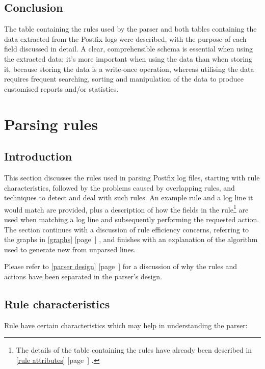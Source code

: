 \documentclass[a4paper,12pt,draft]{article}
\newcommand{\refwithpage}[1]{%
    \empty{}\ref{#1} [page~\pageref{#1}]%
}
\newcommand{\sectionref}[1]{%
    \textsection{}\refwithpage{#1}%
}
\begin{document}
\subsection{Conclusion}

The table containing the rules used by the parser and both tables
containing the data extracted from the Postfix logs were described, with
the purpose of each field discussed in detail.  A clear, comprehensible
schema is essential when using the extracted data; it's more important when
using the data than when storing it, because storing the data is a
write-once operation, whereas utilising the data requires frequent
searching, sorting and manipulation of the data to produce customised
reports and/or statistics.

\section{Parsing rules}

\label{rules}

\subsection{Introduction}

This section discusses the rules used in parsing Postfix log files,
starting with rule characteristics, followed by the problems caused by
overlapping rules, and techniques to detect and deal with such rules.  An
example rule and a log line it would match are provided, plus a description
of how the fields in the rule\footnote{The details of the table containing
the rules have already been described in \sectionref{rule attributes}.} are
used when matching a log line and subsequently performing the requested
action.  The section continues with a discussion of rule efficiency
concerns, referring to the graphs in \sectionref{graphs}, and finishes with
an explanation of the algorithm used to generate new \regexes{} from
unparsed lines.

Please refer to \sectionref{parser design} for a discussion of why the
rules and actions have been separated in the parser's design.

\subsection{Rule characteristics}

\label{rule characteristics}

Rule have certain characteristics which may help in understanding the
parser:
\end{document}
